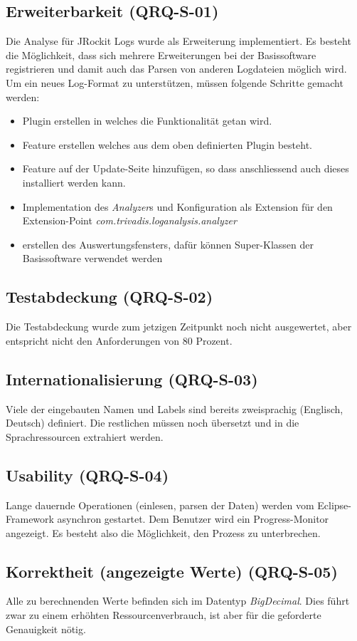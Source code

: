 \subsection{Erweiterbarkeit (QRQ-S-01)}
Die Analyse für JRockit Logs wurde als Erweiterung implementiert. Es besteht die Möglichkeit, dass sich mehrere Erweiterungen bei der Basissoftware registrieren und damit auch das Parsen von anderen Logdateien möglich wird. Um ein neues Log-Format zu unterstützen, müssen folgende Schritte gemacht werden:
\begin{itemize}
\item Plugin erstellen in welches die Funktionalität getan wird.
\item Feature erstellen welches aus dem oben definierten Plugin besteht.
\item Feature auf der Update-Seite hinzufügen, so dass anschliessend auch dieses installiert werden kann.
\item Implementation des \textit{Analyzer}s und Konfiguration als Extension für den Extension-Point \textit{com.trivadis.loganalysis.analyzer}
\item erstellen des Auswertungsfensters, dafür können Super-Klassen der Basissoftware verwendet werden
\end{itemize}

\subsection{Testabdeckung (QRQ-S-02)}
Die Testabdeckung wurde zum jetzigen Zeitpunkt noch nicht ausgewertet, aber entspricht nicht den Anforderungen von 80 Prozent.
\subsection{Internationalisierung (QRQ-S-03)}
Viele der eingebauten Namen und Labels sind bereits zweisprachig (Englisch, Deutsch) definiert. Die restlichen müssen noch übersetzt und in die Sprachressourcen extrahiert werden.

\subsection{Usability (QRQ-S-04)}
Lange dauernde Operationen (einlesen, parsen der Daten) werden vom Eclipse-Framework asynchron gestartet. Dem Benutzer wird ein Progress-Monitor angezeigt. Es besteht also die Möglichkeit, den Prozess zu unterbrechen.

\subsection{Korrektheit (angezeigte Werte) (QRQ-S-05)}
Alle zu berechnenden Werte befinden sich im Datentyp \textit{BigDecimal}. Dies führt zwar zu einem erhöhten Ressourcenverbrauch, ist aber für die geforderte Genauigkeit nötig.